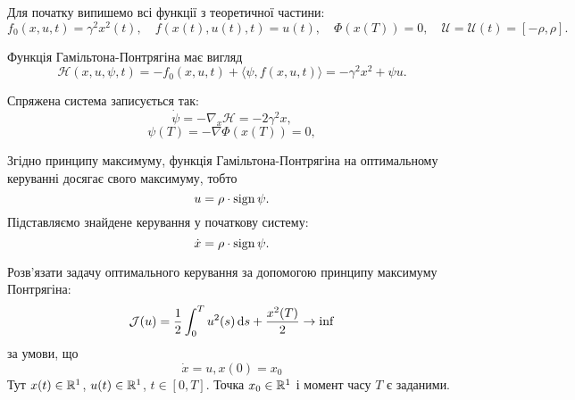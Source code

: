 \begin{solution}
    Для початку випишемо всі функції з теоретичної частини:
    \begin{equation}
        f_0(x, u, t) = \gamma^2 x^2(t), \quad f(x(t), u(t), t) = u(t), \quad \Phi(x(T)) = 0, \quad \mathcal{U} = \mathcal{U}(t) = [-\rho, \rho].
    \end{equation}
    
    Функція Гамільтона-Понтрягіна має вигляд
    \begin{equation}
        \mathcal{H} (x, u, \psi, t) = - f_0(x, u, t) + \langle \psi, f(x, u, t) \rangle = - \gamma^2 x^2 + \psi u.
    \end{equation}
    
    Спряжена система записується так:
    \begin{equation} 
        \dot \psi = - \nabla_x \mathcal{H} = - 2 \gamma^2 x,
    \end{equation}
    \begin{equation} 
        \psi(T) = - \nabla \Phi(x(T)) = 0,
    \end{equation}
    
    Згідно принципу максимуму, функція Гамільтона-Понтрягіна на оптимальному керуванні досягає свого максимуму, тобто
    \begin{equation} 
        u = \rho \cdot \operatorname{sign} \psi.
    \end{equation} 
    Підставляємо знайдене керування у початкову систему:
    \begin{equation}
        \dot x = \rho \cdot \operatorname{sign} \psi.
    \end{equation}
\end{solution}

\begin{problem}
    Розв'язати задачу оптимального керування за допомогою принципу максимуму Понтрягіна:
    \begin{equation*}
        \mathcal{J}(u) = \dfrac12 \int_0^T u^2(s) \mathop{}\!\mathrm{d} s + \dfrac{x^2(T)}{2} \to \inf
    \end{equation*}
    за умови, що
    \begin{equation*}
        \dot x = u, x(0) = x_0
    \end{equation*}
    Тут $x(t) \in \mathbb{R}^1$, $u(t) \in \mathbb{R}^1$, $t \in [0, T]$. Точка $x_0 \in \mathbb{R}^1$ і момент часу $T$ є заданими.
\end{problem}

